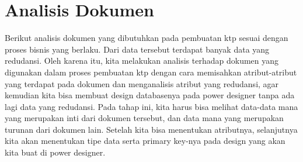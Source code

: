 \section{Analisis Dokumen }
Berikut analisis dokumen yang dibutuhkan pada pembuatan ktp sesuai dengan proses bisnis yang berlaku. Dari data tersebut terdapat banyak data yang redudansi. Oleh karena itu, kita melakukan analisis terhadap dokumen yang digunakan dalam proses pembuatan ktp dengan cara memisahkan atribut-atribut yang terdapat pada dokumen dan menganalisis atribut yang redudansi, agar kemudian kita bisa membuat design databasenya pada power designer tanpa ada lagi data yang redudansi. Pada tahap ini, kita harus bisa melihat data-data mana yang merupakan inti dari dokumen tersebut, dan data mana yang merupakan turunan dari dokumen lain. Setelah kita bisa menentukan atributnya, selanjutnya kita akan menentukan tipe data serta primary key-nya pada design yang akan kita buat di power designer.
